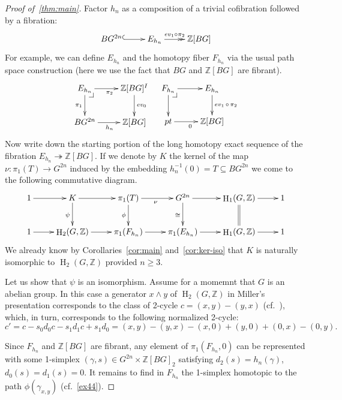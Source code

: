 \documentclass[oneside, 12pt]{amsart}
\makeatletter
\theoremstyle{plain}
\numberwithin{equation}{section}
\numberwithin{lemma}{section}
\theoremstyle{remark}
\theoremstyle{definition}
\DeclareMathOperator{\HH}{H}
\newcommand{\ZZ}{\mathbb{Z}}
\newcommand{\pullbackcorner}[1][dr]{\save*!/#1-1.2pc/#1:(-1,1)@^{|-}\restore}
\makeatother
\begin{document}
\begin{proof}[Proof of~\cref{thm:main}]
Factor $h_n$ as a composition of a trivial cofibration followed by a fibration: 
\begin{equation} \label{eq:fibr-repl} \xymatrix{BG^{2n} \ar@{^{(}->}[r] & E_{h_n} \ar@{->>}^(.45){ev_1 \circ \pi_2}[r] & \ZZ[BG]} \end{equation}
For example, we can define $E_{h_n}$ and the homotopy fiber $F_{h_n}$ via the usual path space construction
 (here we use the fact that $BG$ and $\ZZ[BG]$ are fibrant).
\[ \xymatrix{ E_{h_n}  \ar[r]_{\pi_2} \ar[d]_{\pi_1} \pullbackcorner & \ar[d]^{ev_0} \ZZ[BG]^I\\
              BG^{2n} \ar[r]_{h_n} & \ZZ[BG] } \ \ \ 
   \xymatrix{ F_{h_n}  \ar[r] \ar[d] \pullbackcorner & \ar[d]^{ev_1\,\circ\,\pi_2} E_{h_n} \\
              pt \ar[r]_{0} & \ZZ[BG]}  \]
Now write down the starting portion of the long homotopy exact sequence of the fibration $E_{h_n} \twoheadrightarrow \ZZ[BG]$.
If we denote by $K$ the kernel of the map $\nu\colon \pi_1(T) \to G^{2n}$ induced by the embedding $h_n^{-1}(0)=T \subseteq BG^{2n}$ we 
 come to the following commutative diagram.
\[ \xymatrix{1 \ar[r] & K       \ar[d]_{\psi} \ar[r] & \pi_1(T) \ar[d]_{\phi} \ar[r]_{\nu}     & G^{2n} \ar[r] \ar[d]_{\cong} & \HH_1(G, \ZZ) \ar[r] \ar@{=}[d] & 1 \\
             1 \ar[r] & \HH_2(G, \ZZ) \ar[r] & \pi_1(F_{h_n})           \ar[r]  & \pi_1(E_{h_n}) \ar[r]                       & \HH_1(G, \ZZ) \ar[r] & 1}\]
We already know by Corollaries~\ref{cor:main} and~\ref{cor:ker-iso} that $K$ is naturally isomorphic to $\HH_2(G, \ZZ)$ provided $n\geq 3$.

Let us show that $\psi$ is an isomorphism. Assume for a momemnt that $G$ is an abelian group.
In this case a generator $x \wedge y$ of $\HH_2(G, \ZZ)$ in Miller's presentation corresponds to the class of 2-cycle $c = (x, y) - (y, x)$ (cf.~\cite[(14), p.~582]{Mi52}), which,
  in turn, corresponds to the following normalized 2-cycle:
\begin{equation} \label{eq:normalized} c' = c - s_0d_0c - s_1d_1c + s_1d_0 = (x, y) - (y, x) - (x, 0) +(y, 0) + (0, x) - (0, y). \end{equation}
 
Since $F_{h_n}$ and $\ZZ[BG]$ are fibrant, any element of $\pi_1(F_{h_n}, 0)$ can be represented with 
 some 1-simplex $(\gamma, s) \in G^{2n} \times \ZZ[BG]_2$ satisfying $d_2(s) = h_n(\gamma)$, $d_0(s) = d_1(s)=0$. 
It remains to find in $F_{h_n}$ the 1-simplex homotopic to the path $\phi(\gamma_{x,y})$ (cf.~\cref{ex44}).


\end{proof}
\end{document}
